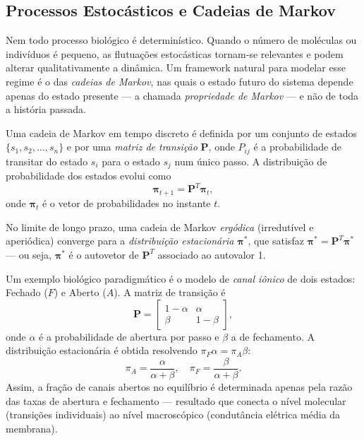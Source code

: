 \subsection{Processos Estocásticos e Cadeias de Markov}

Nem todo processo biológico é determinístico. Quando o número de moléculas ou indivíduos é
pequeno, as flutuações estocásticas tornam-se relevantes e podem alterar qualitativamente a
dinâmica. Um framework natural para modelar esse regime é o das \emph{cadeias de Markov},
nas quais o estado futuro do sistema depende apenas do estado presente --- a chamada
\emph{propriedade de Markov} --- e não de toda a história passada.

\begin{definicaoenv}
Uma cadeia de Markov em tempo discreto é definida por um conjunto de estados
$\{s_1, s_2, \ldots, s_n\}$ e por uma \emph{matriz de transição} $\mathbf{P}$, onde
$P_{ij}$ é a probabilidade de transitar do estado $s_i$ para o estado $s_j$ num único passo.
A distribuição de probabilidade dos estados evolui como
\begin{equation}
  \boldsymbol{\pi}_{t+1} = \mathbf{P}^T \boldsymbol{\pi}_t,
\end{equation}
onde $\boldsymbol{\pi}_t$ é o vetor de probabilidades no instante $t$.
\end{definicaoenv}

No limite de longo prazo, uma cadeia de Markov \emph{ergódica} (irredutível e aperiódica)
converge para a \emph{distribuição estacionária} $\boldsymbol{\pi}^*$, que satisfaz
$\boldsymbol{\pi}^* = \mathbf{P}^T \boldsymbol{\pi}^*$ --- ou seja, $\boldsymbol{\pi}^*$
é o autovetor de $\mathbf{P}^T$ associado ao autovalor 1.

Um exemplo biológico paradigmático é o modelo de \emph{canal iônico} de dois estados:
Fechado ($F$) e Aberto ($A$). A matriz de transição é
\begin{equation}
  \mathbf{P} = \begin{bmatrix} 1 - \alpha & \alpha \\ \beta & 1 - \beta \end{bmatrix},
\end{equation}
onde $\alpha$ é a probabilidade de abertura por passo e $\beta$ a de fechamento. A
distribuição estacionária é obtida resolvendo $\pi_F \alpha = \pi_A \beta$:
\begin{equation}
  \pi_A = \frac{\alpha}{\alpha + \beta}, \quad \pi_F = \frac{\beta}{\alpha + \beta}.
\end{equation}
Assim, a fração de canais abertos no equilíbrio é determinada apenas pela razão das taxas
de abertura e fechamento --- resultado que conecta o nível molecular (transições individuais)
ao nível macroscópico (condutância elétrica média da membrana).

